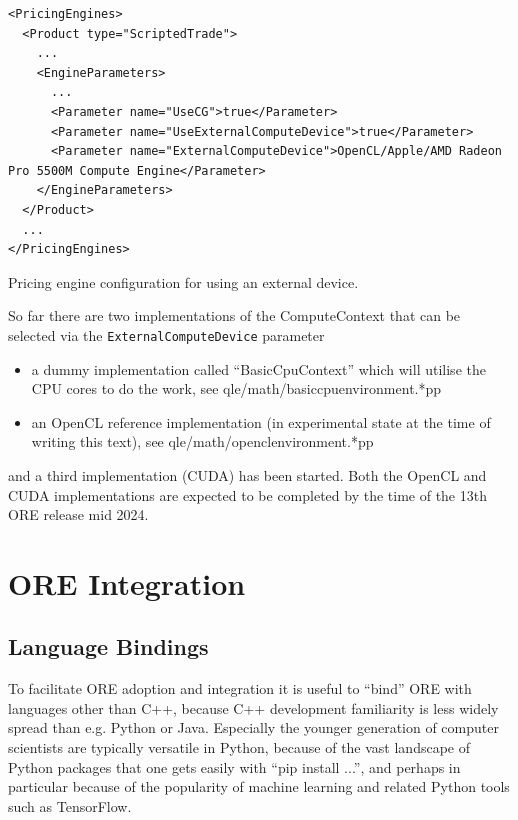 \documentclass[12pt, a4paper]{report}
\begin{document}
\begin{listing}[hbt]
\begin{verbatim}
<PricingEngines>
  <Product type="ScriptedTrade">
    ...
    <EngineParameters>
      ...
      <Parameter name="UseCG">true</Parameter>
      <Parameter name="UseExternalComputeDevice">true</Parameter>
      <Parameter name="ExternalComputeDevice">OpenCL/Apple/AMD Radeon Pro 5500M Compute Engine</Parameter>
    </EngineParameters>
  </Product>
  ...
</PricingEngines>
\end{verbatim}
\caption{Pricing engine configuration for using an external device.}
\label{lst:pricingengine_gpu}
\end{listing}

So far there are two implementations of the ComputeContext that can be selected via the
{\tt ExternalComputeDevice} parameter
\begin{itemize}
\item a dummy implementation called ``BasicCpuContext'' which will utilise the CPU cores to do the work, see qle/math/basiccpuenvironment.*pp
\item an OpenCL reference implementation (in experimental state at the time of writing this text), see qle/math/openclenvironment.*pp
\end{itemize}
and a third implementation (CUDA) has been started. Both the OpenCL and CUDA implementations are
expected to be completed by the time of the 13th ORE release mid 2024.


\chapter{ORE Integration}

\section{Language Bindings}

To facilitate ORE adoption and integration it is useful to ``bind'' ORE with languages other
than C++, because C++ development familiarity is less widely spread than e.g. Python or Java.
Especially the younger generation of computer scientists are typically versatile in Python,
because of the vast landscape of Python packages that one gets easily with ``pip install ...'',
and perhaps in particular because of the popularity of machine learning and related Python tools
such as TensorFlow.
\end{document}

